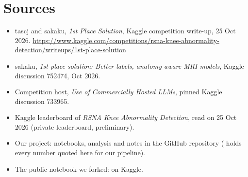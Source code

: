 \section*{Sources}

\begin{itemize}
\item tascj and sakaku, \emph{1st Place Solution}, Kaggle competition write-up, 25 Oct 2026.
      \url{https://www.kaggle.com/competitions/rsna-knee-abnormality-detection/writeups/1st-place-solution}
\item sakaku, \emph{1st place solution: Better labels, anatomy-aware MRI models}, Kaggle discussion 752474, Oct 2026.
\item Competition host, \emph{Use of Commercially Hosted LLMs}, pinned Kaggle discussion 733965.
\item Kaggle leaderboard of \emph{RSNA Knee Abnormality Detection}, read on 25 Oct 2026 (private leaderboard, preliminary).
\item Our project: notebooks, analysis and notes in the GitHub repository 
      ( holds every number quoted here for our pipeline).
\item The public notebook we forked:  on Kaggle.
\end{itemize}
